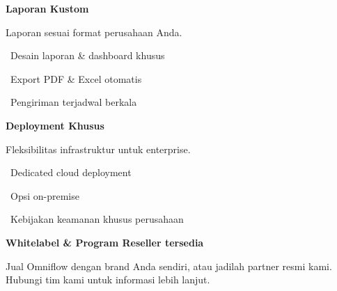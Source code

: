 \documentclass[a4paper]{article}
\begin{document}
\noindent
\begin{minipage}[t]{0.485\textwidth}
    \colorbox{OrangePrimary}{%
        \begin{minipage}{\dimexpr\textwidth-2\fboxsep\relax}
            {\fontsize{10}{13}\selectfont\bfseries\color{White} Laporan Kustom}
        \end{minipage}}\par
    \vspace{4pt}
    {\fontsize{9}{12}\selectfont\color{TextDark}%
    Laporan sesuai format perusahaan Anda.\par\vspace{3pt}
    \textbullet\ Desain laporan \& dashboard khusus\par\vspace{2pt}%
    \textbullet\ Export PDF \& Excel otomatis\par\vspace{2pt}%
    \textbullet\ Pengiriman terjadwal berkala}%
\end{minipage}%
\hfill
\begin{minipage}[t]{0.485\textwidth}
    \colorbox{EmeraldDark}{%
        \begin{minipage}{\dimexpr\textwidth-2\fboxsep\relax}
            {\fontsize{10}{13}\selectfont\bfseries\color{White} Deployment Khusus}
        \end{minipage}}\par
    \vspace{4pt}
    {\fontsize{9}{12}\selectfont\color{TextDark}%
    Fleksibilitas infrastruktur untuk enterprise.\par\vspace{3pt}
    \textbullet\ Dedicated cloud deployment\par\vspace{2pt}%
    \textbullet\ Opsi on-premise\par\vspace{2pt}%
    \textbullet\ Kebijakan keamanan khusus perusahaan}%
\end{minipage}

\vspace{8pt}

{\setlength{\fboxsep}{8pt}\setlength{\fboxrule}{0pt}%
\noindent\colorbox{BlueBg}{%
    \begin{minipage}{\dimexpr\textwidth-2\fboxsep\relax}
        \centering
        {\fontsize{9}{12}\selectfont\bfseries\color{BluePrimary} Whitelabel \& Program Reseller tersedia}\par\vspace{1pt}
        {\fontsize{8.5}{11}\selectfont\color{TextDark} Jual Omniflow dengan brand Anda sendiri, atau jadilah partner resmi kami. Hubungi tim kami untuk informasi lebih lanjut.}
    \end{minipage}}}
\end{document}
